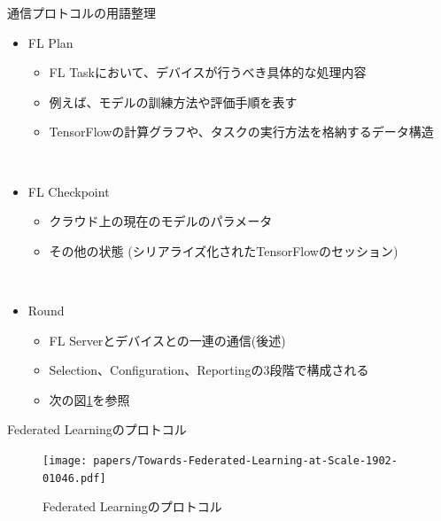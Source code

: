 \documentclass[dvipdfmx,notheorems,t]{beamer}
\begin{document}
\begin{frame}{通信プロトコルの用語整理}

\begin{itemize}
	\item \alert{FL Plan}
	\begin{itemize}
		\item FL Taskにおいて、デバイスが行うべき具体的な処理内容
		\item 例えば、モデルの訓練方法や評価手順を表す
		\newline
		
		\item TensorFlowの計算グラフや、タスクの実行方法を格納するデータ構造
	\end{itemize} \
	
	\item \alert{FL Checkpoint}
	\begin{itemize}
		\item クラウド上の現在のモデルのパラメータ
		\item その他の状態 (シリアライズ化されたTensorFlowのセッション)
	\end{itemize} \
	
	\item \alert{Round}
	\begin{itemize}
		\item FL Serverとデバイスとの一連の通信(後述)
		\item \alert{Selection}、\alert{Configuration}、\alert{Reporting}の3段階で構成される
		\item 次の図\ref{fig:fl-protocol}を参照
	\end{itemize}
\end{itemize}

\end{frame}

\begin{frame}{Federated Learningのプロトコル}

\begin{figure}
	\centering
	\texttt{[image: papers/Towards-Federated-Learning-at-Scale-1902-01046.pdf]}
	\caption{Federated Learningのプロトコル~\cite{1902.01046}}
	\label{fig:fl-protocol}
\end{figure}

\end{frame}
\end{document}
